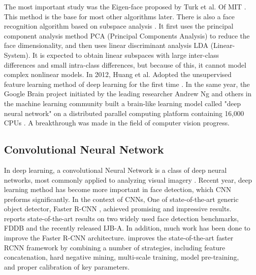 \documentclass[conference]{IEEEtran}
\begin{document}
The most important study was the Eigen-face proposed by Turk et al. Of MIT \cite{b4}. This method is the base for most other algorithms later. There is also a face recognition algorithm based on subspace analysis \cite{b5}. It first uses the principal component analysis method PCA (Principal Components Analysis) \cite{b4} to reduce the face dimensionality, and then uses linear discriminant analysis LDA (Linear-System)\cite{b5}. It is expected to obtain linear subspaces with large inter-class differences and small intra-class differences, but because of this, it cannot model complex nonlinear models. In 2012, Huang et al. Adopted the unsupervised feature learning method of deep learning for the first time \cite{b6}. In the same year,  the Google Brain project initiated by the leading researcher Andrew Ng and others in the machine learning community built a brain-like learning model called "deep neural network" on a distributed parallel computing platform containing 16,000 CPUs \cite{b7}. A breakthrough was made in the field of computer vision progress.


\subsection{Convolutional Neural Network }
In deep learning, a convolutional Neural Network is a class of deep neural networks, most commonly applied to analyzing visual imagery \cite{b8}. Recent year, deep learning method has become more important in  face detection, which CNN preforms significantly. In the context of CNNs, One of state-of-the-art generic object detector, Faster R-CNN \cite{b9}, achieved promising and impressive results. \cite{b10} reports state-of-the-art results on two widely used face detection benchmarks, FDDB and the recently released IJB-A. In addition, much work has been done to improve the Faster R-CNN architecture. \cite{b11} improves the state-of-the-art faster RCNN framework by combining a number of strategies, including feature concatenation, hard negative mining, multi-scale training, model pre-training, and proper calibration of key parameters. 
\end{document}
